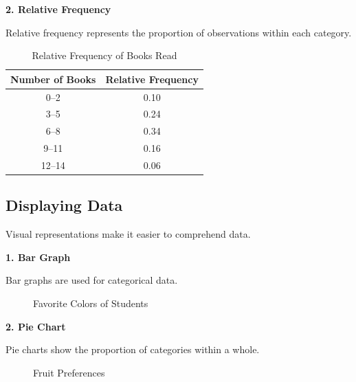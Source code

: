 \documentclass[twoside]{book}
\begin{document}
\textbf{2. Relative Frequency}

Relative frequency represents the proportion of observations within each category.

\begin{table}[h]
\centering
\begin{tabular}{c|c}
\hline
\textbf{Number of Books} & \textbf{Relative Frequency} \\
\hline
0--2 & 0.10 \\
3--5 & 0.24 \\
6--8 & 0.34 \\
9--11 & 0.16 \\
12--14 & 0.06 \\
\hline
\end{tabular}
\caption{Relative Frequency of Books Read}
\end{table}

\subsection{Displaying Data}

Visual representations make it easier to comprehend data.

\textbf{1. Bar Graph}

Bar graphs are used for categorical data.

\begin{figure}[H]
\centering
{}
\caption{Favorite Colors of Students}
\end{figure}

\textbf{2. Pie Chart}

Pie charts show the proportion of categories within a whole.

\begin{figure}[H]
\centering
{}
\caption{Fruit Preferences}
\end{figure}
\end{document}
